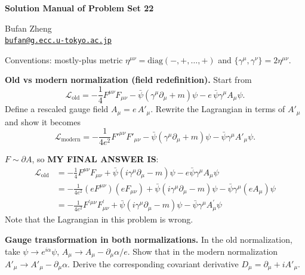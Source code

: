 \resetproblem
\begin{center}
    {\LARGE \textbf{Solution Manual of Problem Set 22} \par}
    \vspace{1em}
    {\large Bufan Zheng\\ \href{mailto:bufan@g.ecc.u-tokyo.ac.jp}{\texttt{bufan@g.ecc.u-tokyo.ac.jp}} \par}
\end{center}

\noindent Conventions: mostly-plus metric \( \eta^{\mu\nu}=\mathrm{diag}(-,+,\ldots,+) \) and \( \{\gamma^\mu,\gamma^\nu\}=2\eta^{\mu\nu} \).

\begin{problem}
    \textbf{Old vs modern normalization (field redefinition).} Start from
    \[
        \mathcal{L}_{\text{old}}
        = -\frac{1}{4}F^{\mu\nu}F_{\mu\nu}
        - \bar{\psi}(\gamma^\mu\partial_\mu + m)\psi
        - e\,\bar{\psi}\gamma^\mu A_\mu\psi.
    \]
    Define a rescaled gauge field \(A_\mu = e\,A'_\mu\). Rewrite the Lagrangian in terms of \(A'_\mu\) and show it becomes
    \[
        \mathcal{L}_{\text{modern}}
        = -\frac{1}{4e^{2}}F'^{\mu\nu}F'_{\mu\nu}
        - \bar{\psi}(\gamma^\mu\partial_\mu + m)\psi
        - \bar{\psi}\gamma^\mu A'_\mu\psi.
    \]
\end{problem}
\begin{solution}[22.1]
	$F\sim\partial A$, so \textbf{MY FINAL ANSWER IS}:
	\[
	\begin{aligned}
	\mathcal{L}_{\mathrm{old}}&=-\frac{1}{4}F^{\mu\nu}F_{\mu\nu}+\bar{\psi}(i\gamma^\mu\partial_\mu-m)\psi-e\bar{\psi}\gamma^\mu A_\mu\psi\\
	&=-\frac{1}{4e^2}\left(eF^{\mu\nu}\right)\left(eF_{\mu\nu}\right)+\bar{\psi}(i\gamma^\mu\partial_\mu-m)\psi-\bar{\psi}\gamma^\mu \left(eA_\mu\right)\psi\\
	&=-\frac{1}{4e^2}F^{\prime\mu\nu}F_{\mu\nu}^{\prime}+\bar{\psi}(i\gamma^\mu\partial_\mu-m)\psi-\bar{\psi}\gamma^\mu A_\mu^{\prime}\psi
	\end{aligned}
	\]
	Note that the Lagrangian in this problem is wrong.
\end{solution}
\begin{problem}
    \textbf{Gauge transformation in both normalizations.} In the old normalization, take \(\psi\to e^{i\alpha}\psi\), \(A_\mu\to A_\mu-\partial_\mu\alpha/e\). Show that in the modern normalization \(A'_\mu\to A'_\mu-\partial_\mu\alpha\). Derive the corresponding covariant derivative \(D_\mu=\partial_\mu+iA'_\mu\).
\end{problem}
